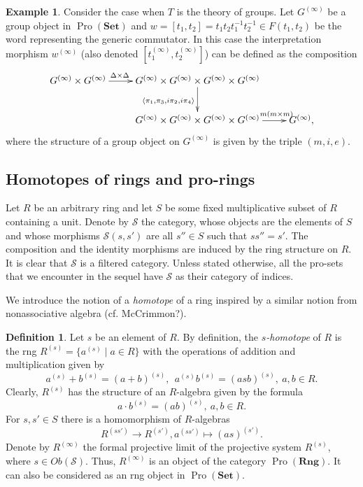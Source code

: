 \documentclass{article}
\numberwithin{equation}{section}
\theoremstyle{definition}
\newtheorem{df}[lemma]{Definition} \Crefname{df}{Definition}{Definitions}
\newtheorem{example}[lemma]{Example} \Crefname{example}{Example}{Examples}
\theoremstyle{remark}
\DeclareMathOperator{\Pro}{Pro}
\newcommand{\Set}{\mathbf{Set}}
\newcommand{\Rng}{\mathbf{Rng}}
\begin{document}
\begin{example}\label{example-commutator}
Consider the case when $T$ is the theory of groups.
Let $G^{(\infty)}$ be a group object in $\Pro(\Set)$ and $w = [t_1, t_2] = t_1 t_2 t_1^{-1} t_2^{-1} \in F(t_1, t_2)$ be the word representing the generic commutator.
In this case the interpretation morphism $w^{(\infty)}$ (also denoted $[t_1^{(\infty)}, t_2^{(\infty)}]$) can be defined as the composition
 \[ \xymatrix{G^{(\infty)} \times G^{(\infty)} \ar[r]^(.35){\Delta \times \Delta} & G^{(\infty)} \times G^{(\infty)} \times G^{(\infty)} \times G^{(\infty)} \ar[d]_{\langle \pi_1, \pi_3, i\pi_2, i\pi_4 \rangle} & \\
    & G^{(\infty)} \times G^{(\infty)} \times G^{(\infty)} \times G^{(\infty)} \ar[r]^(.76){m(m\times m)} & G^{(\infty)},} \]
where the structure of a group object on $G^{(\infty)}$ is given by the triple $(m, i, e)$.
\end{example}

\subsection{Homotopes of rings and pro-rings}
Let $R$ be an arbitrary ring and let \(S\) be some fixed multiplicative subset of $R$ containing a unit. Denote by $\mathcal{S}$ the category, whose objects are the elements of \(S\) and whose morphisms \(\mathcal{S}(s, s')\) are all \(s'' \in S\) such that \(ss'' = s'\). The composition and the identity morphisms are induced by the ring structure on $R$. It is clear that $\mathcal{S}$ is a filtered category. Unless stated otherwise, all the pro-sets that we encounter in the sequel have \(\mathcal S\) as their category of indices.

We introduce the notion of a {\it homotope} of a ring inspired by a similar notion from nonassociative algebra (cf. McCrimmon?). 
\begin{df} \label{ring-homotope}
 Let $s$ be an element of $R$.  
 By definition, the {\it \(s\)-homotope} of \(R\) is the rng \(R^{(s)} = \{a^{(s)} \mid a \in R\}\) with the operations of addition and multiplication given by
 \[ a^{(s)} + b^{(s)} = (a + b)^{(s)},\ \ a^{(s)} b^{(s)} = (asb)^{(s)},\ a, b\in R.\]
 Clearly, $R^{(s)}$ has the structure of an \(R\)-algebra given by the formula \[a \cdot b^{(s)} = (ab)^{(s)},\ a, b \in R.\] For \(s, s' \in S\) there is a homomorphism of \(R\)-algebras \[R^{(ss')} \to R^{(s')}, a^{(ss')} \mapsto (as)^{(s')}.\]
 Denote by \(R^{(\infty)}\) the formal projective limit of the projective system \(R^{(s)}\), where \(s \in Ob(\mathcal S)\).
 Thus, $R^{(\infty)}$ is an object of the category $\Pro(\Rng)$. 
 It can also be considered as an rng object in \(\Pro(\Set)\).  
\end{df}
\end{document}
